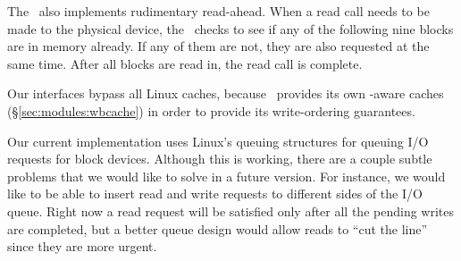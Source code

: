 The \module\ also implements rudimentary read-ahead. When a read call needs to
be made to the physical device, the \module\ checks to see if any of the
following nine blocks are in memory already. If any of them are not, they are
also requested at the same time. After all blocks are read in, the read call is
complete.

Our interfaces bypass all Linux caches, because \Kudos\ provides its own
\chdesc-aware caches (\S\ref{sec:modules:wbcache}) in order to provide its
write-ordering guarantees.

Our current implementation uses Linux's queuing structures for queuing I/O
requests for block devices. Although this is working, there are a couple subtle
problems that we would like to solve in a future version. For instance, we
would like to be able to insert read and write requests to different sides of
the I/O queue. Right now a read request will be satisfied only after all the
pending writes are completed, but a better queue design would allow reads to
``cut the line'' since they are more urgent.
